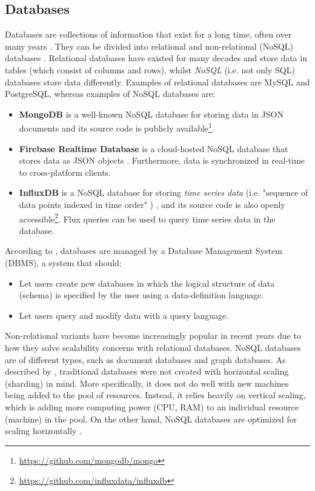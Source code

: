 \documentclass{article}
\begin{document}
\subsection{Databases}\label{subsec:Databases}
Databases are collections of information that exist for a long time, often over many years \cite{garcia-molina_database_2002}. They can be divided into relational and non-relational (NoSQL) databases \cite{mohamed_relational_2014}. Relational databases have existed for many decades and store data in tables (which consist of columns and rows), whilst \emph{NoSQL} (i.e. not only SQL) databases store data differently. Examples of relational databases are MySQL and PostgreSQL, whereas examples of NoSQL databases are: 
\begin{itemize}
    \item \textbf{MongoDB} is a well-known NoSQL database for storing data in JSON documents and its source code is publicly available\footnote{\url{https://github.com/mongodb/mongo}}.
    \item \textbf{Firebase Realtime Database} is a cloud-hosted NoSQL database that stores data as JSON objects  \cite{noauthor_firebase_nodate}. Furthermore, data is synchronized in real-time to cross-platform clients.
    \item \textbf{InfluxDB} is a NoSQL database for storing \emph{time series data} (i.e. "sequence of data points indexed in time order" \cite{noauthor_what_nodate})  \cite{noauthor_influxdb_nodate}, and its source code is also openly accessible\footnote{\url{https://github.com/influxdata/influxdb}}. Flux queries can be used to query time series data in the database.
\end{itemize}

According to \citeauthor{garcia-molina_database_2002}, databases are managed by a Database Management System (DBMS), a system that should:
\begin{itemize}
    \item Let users create new databases in which the logical structure of data (schema) is specified by the user using a data-definition language.
    \item Let users query and modify data with a query language.
\end{itemize}

Non-relational variants have become increasingly popular in recent years due to how they solve scalability concerns with relational databases. NoSQL databases are of different types, such as document databases and graph databases. As described by \citeauthor{mohamed_relational_2014}, traditional databases were not created with horizontal scaling (sharding) in mind. More specifically, it does not do well with new machines being added to the pool of resources. Instead, it relies heavily on vertical scaling, which is adding more computing power (CPU, RAM) to an individual resource (machine) in the pool. On the other hand, NoSQL databases are optimized for scaling horizontally \cite{mohamed_relational_2014, kim_geoycsb_2023}.
\end{document}
